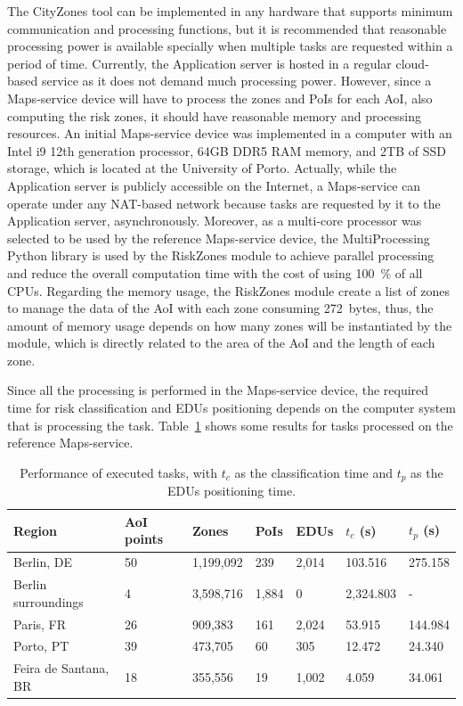 \begin{refsection}
The CityZones tool can be implemented in any hardware that supports minimum communication and processing functions, but it is recommended that reasonable processing power is available specially when multiple tasks are requested within a period of time. Currently, the Application server is hosted in a regular cloud-based service as it does not demand much processing power. However, since a Maps-service device will have to process the zones and PoIs for each AoI, also computing the risk zones, it should have reasonable memory and processing resources. An initial Maps-service device was implemented in a computer with an Intel i9 12th generation processor, 64GB DDR5 RAM memory, and 2TB of SSD storage, which is located at the University of Porto. Actually, while the Application server is publicly accessible on the Internet, a Maps-service can operate under any NAT-based network because tasks are requested by it to the Application server, asynchronously. Moreover, as a multi-core processor was selected to be used by the reference Maps-service device, the MultiProcessing Python library is used by the RiskZones module to achieve parallel processing and reduce the overall computation time with the cost of using 100~\% of all CPUs. Regarding the memory usage, the RiskZones module create a list of zones to manage the data of the AoI with each zone consuming 272~bytes, thus, the amount of memory usage depends on how many zones will be instantiated by the module, which is directly related to the area of the AoI and the length of each zone.

Since all the processing is performed in the Maps-service device, the required time for risk classification and EDUs positioning depends on the computer system that is processing the task. Table~\ref{tab:performance} shows some results for tasks processed on the reference Maps-service. 

\begin{table}[htbp]
  \centering
  \caption{Performance of executed tasks, with $t_c$ as the classification time and $t_p$ as the EDUs positioning time.}\label{tab:performance}
  \begin{tabular}{p{2.3cm}llllll}
    \hline
    \textbf{Region}         & \textbf{AoI points} & \textbf{Zones} & \textbf{PoIs} & \textbf{EDUs} & \textbf{$t_c$ (s)} & \textbf{$t_p$ (s)} \\
    \hline
    Berlin, DE              & 50         & 1,199,092 & 239    & 2,014  & 103.516   & 275.158 \\
    Berlin surroundings     & 4          & 3,598,716 & 1,884  & 0      & 2,324.803 & - \\
    Paris, FR               & 26         & 909,383   & 161    & 2,024  & 53.915    & 144.984 \\
    Porto, PT               & 39         & 473,705   & 60     & 305    & 12.472    & 24.340 \\
    Feira de Santana, BR    & 18         & 355,556   & 19     & 1,002  & 4.059     & 34.061 \\
    \hline
  \end{tabular}
\end{table}


\end{refsection}
